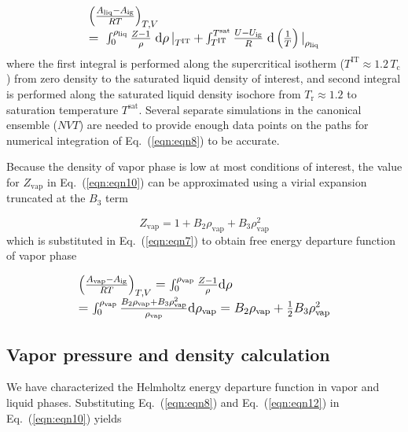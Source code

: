 \documentclass[5p,times]{elsarticle}
\begin{document}
\begin{equation}
\begingroup
\large
\begin{array}{l}
\left( \frac{A_\mathrm{liq} -A_\mathrm{ig} }{RT} \right)_{T,V}
\\ 
{=\; \int _{0}^{\rho _{\mathrm{liq}} }\frac{Z-1}{\rho } \; \mathrm{d}\rho \mathop{|}\nolimits_{T^{\mathrm{IT}}} +\int _{T^{\mathrm{IT}}}^{T^{\mathrm{\mathrm{sat}}}
} \frac{U-U_\mathrm{ig}}{R} \; \mathrm{d} \left(\frac{1}{T} \right) \mathop{|}\nolimits_{\rho _{\mathrm{liq}}}}  
\end{array} 
\endgroup
\label{eqn:eqn8}
\end{equation}
where the first integral is performed along the supercritical isotherm ($T^{\mathrm{IT}} \approx 1.2\,T_\mathrm{c}$) from zero density to the saturated liquid density of interest, and second integral is performed along the saturated liquid density isochore from $T_\mathrm{r} \approx 1.2$ to saturation temperature $T^\mathrm{sat}$. Several separate simulations in the canonical ensemble ($NVT$) are needed to provide enough data points on the paths for numerical integration of Eq.~(\ref{eqn:eqn8}) to be accurate.

Because the density of vapor phase is low at most conditions of interest, the value for $Z_{\mathrm{vap}}$ in Eq.~(\ref{eqn:eqn10}) can be approximated using a virial expansion truncated at the $B_3$ term

\begin{equation}
{Z_{\mathrm{vap}}} = 1 + {B_2}{\rho_{\mathrm{vap}}} + {B_3}\rho_{\mathrm{vap}}^2
\label{eqn:eqn11}
\end{equation}
which is substituted in Eq.~(\ref{eqn:eqn7}) to obtain free energy departure function of vapor phase

\begin{equation}
\begingroup
\large
\begin{array}{l}{\left( {\frac{{{A_\mathrm{vap}} - {A_\mathrm{ig}}}}{{RT}}} \right)_{T,V}} = \int_0^{{\rho _{\mathrm{vap}}}} {\frac{{Z - 1}}{\rho } \mathrm{d}\rho } \\ = \int_0^{{\rho
_{\mathrm{vap}}}} {\frac{{{B_2}{\rho _{\mathrm{vap}}} + {B_3}\rho _{\mathrm{vap}}^2}}{\rho_{\mathrm{vap}} } \mathrm{d}\rho_{\mathrm{vap}} } = {B_2}{\rho _{\mathrm{vap}}} + \frac{1}{2}{B_3}\rho _{\mathrm{vap}}^2\end{array} 
\endgroup
\label{eqn:eqn12}
\end{equation}

\subsection{Vapor pressure and density calculation}
We have characterized the Helmholtz energy departure function in vapor and liquid phases. Substituting Eq.~(\ref{eqn:eqn8}) and Eq.~(\ref{eqn:eqn12}) in Eq.~(\ref{eqn:eqn10}) yields
\end{document}
